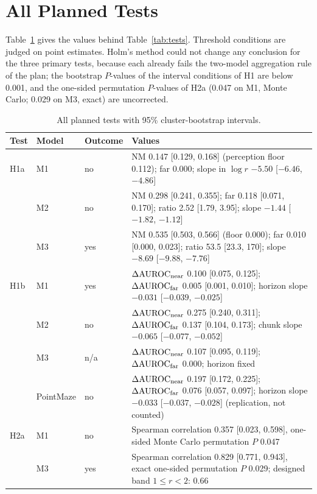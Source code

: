 \documentclass[10pt]{article}
\newcommand{\dauc}{\Delta\mathrm{AUROC}}
\begin{document}
\section{All Planned Tests}
\label{app:tests}

Table~\ref{tab:alltests} gives the values behind Table~\ref{tab:tests}. Threshold conditions are judged on point estimates. Holm's method could not change any conclusion for the three primary tests, because each already fails the two-model aggregation rule of the plan; the bootstrap $P$-values of the interval conditions of H1 are below 0.001, and the one-sided permutation $P$-values of H2a (0.047 on M1, Monte Carlo; 0.029 on M3, exact) are uncorrected.

\begin{table}[h]
\caption{All planned tests with 95\% cluster-bootstrap intervals.}
\label{tab:alltests}
\centering\scriptsize
\setlength{\tabcolsep}{3pt}
\begin{tabular}{>{\raggedright}p{1.0cm}>{\raggedright}p{1.3cm}>{\raggedright}p{1.1cm}>{\raggedright\arraybackslash}p{10.75cm}}
\toprule
Test & Model & Outcome & Values \\
\midrule
H1a & M1 & no & NM 0.147 [0.129, 0.168] (perception floor 0.112); far 0.000; slope in $\log r$ $-5.50$ [$-6.46$, $-4.86$] \\
 & M2 & no & NM 0.298 [0.241, 0.355]; far 0.118 [0.071, 0.170]; ratio 2.52 [1.79, 3.95]; slope $-1.44$ [$-1.82$, $-1.12$] \\
 & M3 & yes & NM 0.535 [0.503, 0.566] (floor 0.000); far 0.010 [0.000, 0.023]; ratio 53.5 [23.3, 170]; slope $-8.69$ [$-9.88$, $-7.76$] \\
H1b & M1 & yes & $\dauc_{\rm near}$ 0.100 [0.075, 0.125]; $\dauc_{\rm far}$ 0.005 [0.001, 0.010]; horizon slope $-0.031$ [$-0.039$, $-0.025$] \\
 & M2 & no & $\dauc_{\rm near}$ 0.275 [0.240, 0.311]; $\dauc_{\rm far}$ 0.137 [0.104, 0.173]; chunk slope $-0.065$ [$-0.077$, $-0.052$] \\
 & M3 & n/a & $\dauc_{\rm near}$ 0.107 [0.095, 0.119]; $\dauc_{\rm far}$ 0.000; horizon fixed \\
 & PointMaze & no & $\dauc_{\rm near}$ 0.197 [0.172, 0.225]; $\dauc_{\rm far}$ 0.076 [0.057, 0.097]; horizon slope $-0.033$ [$-0.037$, $-0.028$] (replication, not counted) \\
H2a & M1 & no & Spearman correlation 0.357 [0.023, 0.598], one-sided Monte Carlo permutation $P$ 0.047 \\
 & M3 & yes & Spearman correlation 0.829 [0.771, 0.943], exact one-sided permutation $P$ 0.029; designed band $1\le r<2$: 0.66 \\

\end{tabular}
\end{table}
\end{document}
